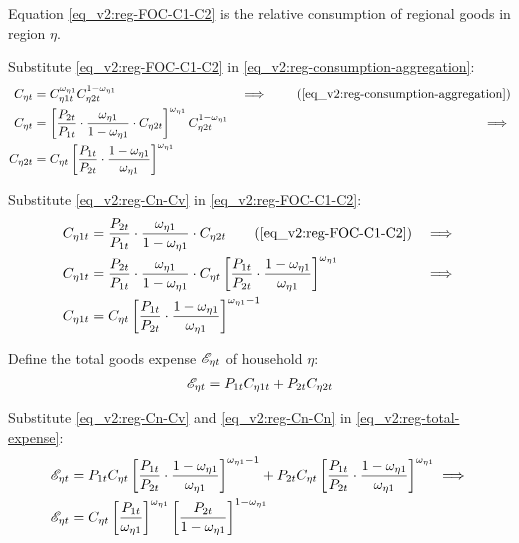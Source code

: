 \documentclass[../thesis.tex]{subfiles}
\begin{document}
Equation \ref{eq_v2:reg-FOC-C1-C2} is the relative consumption of regional goods in region $\eta$.

Substitute \ref{eq_v2:reg-FOC-C1-C2} in \ref{eq_v2:reg-consumption-aggregation}:
\begin{alignat}{2}
	C_{\eta t} &= C_{\eta 1 t}^{\omega_{\eta 1}} C_{\eta 2 t}^{1-\omega_{\eta 1}} &\implies \tag{\ref{eq_v2:reg-consumption-aggregation}} \\
	C_{\eta t} &= \left[ \frac{P_{2 t}}{P_{1 t}} \cdot \frac{\omega_{\eta 1}}{1 -\omega_{\eta 1}} \cdot C_{\eta 2 t} \right]^{\omega_{\eta 1}} C_{\eta 2 t}^{1-\omega_{\eta 1}} &\implies \nonumber \\
	C_{\eta 2 t} &= C_{\eta t} \left[ \frac{P_{1 t}}{P_{2 t}} \cdot \frac{1 -\omega_{\eta 1}}{\omega_{\eta 1}} \right]^{\omega_{\eta 1}} \label{eq_v2:reg-Cn-Cv}
\end{alignat}

Substitute \ref{eq_v2:reg-Cn-Cv} in \ref{eq_v2:reg-FOC-C1-C2}:
\begin{alignat}{2}
	C_{\eta 1 t} &= \frac{P_{2 t}}{P_{1 t}} \cdot \frac{\omega_{\eta 1}}{1 -\omega_{\eta 1}} \cdot C_{\eta 2 t} \tag{\ref{eq_v2:reg-FOC-C1-C2}} &\implies \nonumber \\
	C_{\eta 1 t} &= \frac{P_{2 t}}{P_{1 t}} \cdot \frac{\omega_{\eta 1}}{1 -\omega_{\eta 1}} \cdot C_{\eta t} \left[ \frac{P_{1 t}}{P_{2 t}} \cdot \frac{1 -\omega_{\eta 1}}{\omega_{\eta 1}} \right]^{\omega_{\eta 1}} &\implies \nonumber \\
	C_{\eta 1 t} &= C_{\eta t} \left[ \frac{P_{1 t}}{P_{2 t}} \cdot \frac{1 -\omega_{\eta 1}}{\omega_{\eta 1}} \right]^{\omega_{\eta 1} -1} \label{eq_v2:reg-Cn-Cn}
\end{alignat}

Define the total goods expense ${\mathscr{E}_{\eta t}}$ of household $\eta$:
\begin{align}
	{\mathscr{E}_{\eta t}} = P_{1 t} C_{\eta 1 t} + P_{2 t} C_{\eta 2 t} \label{eq_v2:reg-total-expense}
\end{align}

Substitute \ref{eq_v2:reg-Cn-Cv} and \ref{eq_v2:reg-Cn-Cn} in \ref{eq_v2:reg-total-expense}:
\begin{align}
	{\mathscr{E}_{\eta t}} &= P_{1 t} C_{\eta t} \left[ \frac{P_{1 t}}{P_{2 t}} \cdot \frac{1 -\omega_{\eta 1}}{\omega_{\eta 1}} \right]^{\omega_{\eta 1} -1} + P_{2 t} C_{\eta t} \left[ \frac{P_{1 t}}{P_{2 t}} \cdot \frac{1 -\omega_{\eta 1}}{\omega_{\eta 1}} \right]^{\omega_{\eta 1}} \implies \nonumber \\
	{\mathscr{E}_{\eta t}} &= C_{\eta t} \left[ \frac{P_{1 t}}{\omega_{\eta 1}} \right]^{\omega_{\eta 1}} \left[ \frac{P_{2 t}}{1 -\omega_{\eta 1}} \right]^{1 -\omega_{\eta 1}} \label{eq_v2:reg-total-expense-level}
\end{align}
\end{document}
